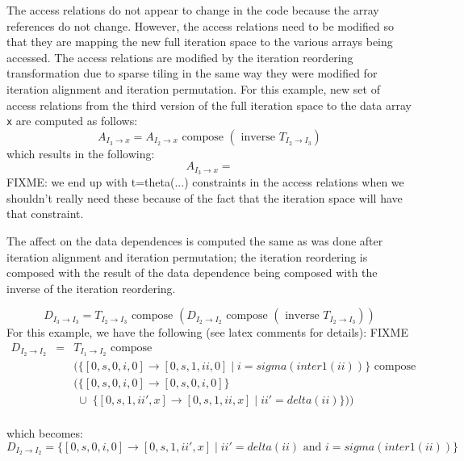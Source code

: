 \documentclass{article}
\begin{document}
The access relations do not appear to change in the code because the array references do not change.  However, the access relations need to be modified so that they are mapping the new full iteration space to the various arrays being accessed. 
The access relations are modified by the iteration reordering transformation due to sparse tiling in the same way they were modified for iteration alignment and iteration permutation.
For this example, new set of access relations from the third version of the full iteration space to the data array {\tt x} are computed as follows:
\[
	 A_{I_3 \rightarrow x} = A_{I_2 \rightarrow x} \mbox{ compose } (\mbox{ inverse } T_{I_2 \rightarrow I_3})
\]
which results in the following:
\[
	 A_{I_3 \rightarrow x} = 
\]
FIXME: we end up with t=theta(...) constraints in the access relations when we shouldn't really need these because of the fact that the iteration space will have that constraint.

The affect on the data dependences is computed the same as was done after iteration alignment and iteration permutation; the 
iteration reordering is composed with the result of the data dependence being composed with
the inverse of the iteration reordering.

\[
	D_{I_3  \rightarrow I_3} = T_{I_2 \rightarrow I_3}  \mbox{ compose }  (D_{I_2  \rightarrow I_2}  \mbox{ compose } (\mbox{ inverse } T_{I_2 \rightarrow I_3}) )
\]
For this example, we have the following (see latex comments for details):
FIXME
\[
\begin{array}{rcl}
	D_{I_2  \rightarrow I_2} & = & T_{I_1 \rightarrow I_2}  \mbox{ compose } \\
	&  & ( \{ [0, s, 0, i, 0] \rightarrow [0, s, 1, ii, 0]  \; | \;  i = sigma(inter1(ii))\} \mbox{ compose } \\
	& & (\{ [0, s, 0, i, 0 ] \rightarrow [ 0, s, 0, i, 0]  \} \\
	& & \; \cup \; \{ [0, s, 1, ii', x ] \rightarrow [ 0, s, 1, ii, x] \; | \; ii' = delta(ii) \} )  ) \\
\end{array}
\]


which becomes:
\[
	D_{I_2  \rightarrow I_2}  = \{   [ 0, s, 0, i, 0 ] \rightarrow [0, s,1, ii', x ] \; | \; ii' = delta(ii) \mbox{ and } i = sigma(inter1(ii)) \} 
\]
\end{document}
